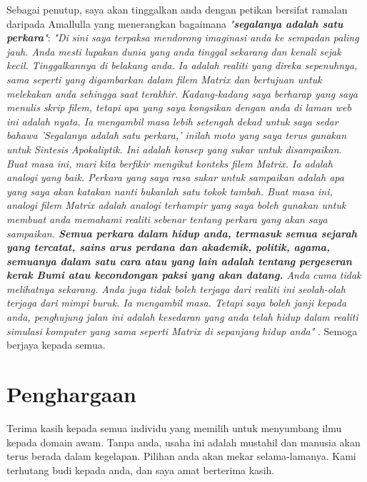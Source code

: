 \documentclass[10pt,twocolumn,letterpaper]{article}
\begin{document}
Sebagai penutup, saya akan tinggalkan anda dengan petikan bersifat ramalan daripada Amallulla yang menerangkan bagaimana \textit{"\textbf{segalanya adalah satu perkara}"}: \textit{"Di sini saya terpaksa mendorong imaginasi anda ke sempadan paling jauh. Anda mesti lupakan dunia yang anda tinggal sekarang dan kenali sejak kecil. Tinggalkannya di belakang anda. Ia adalah realiti yang direka sepenuhnya, sama seperti yang digambarkan dalam filem Matrix dan bertujuan untuk melekakan anda sehingga saat terakhir. Kadang-kadang saya berharap yang saya menulis skrip filem, tetapi apa yang saya kongsikan dengan anda di laman web ini adalah nyata. Ia mengambil masa lebih setengah dekad untuk saya sedar bahawa 'Segalanya adalah satu perkara,' inilah moto yang saya terus gunakan untuk Sintesis Apokaliptik. Ini adalah konsep yang sukar untuk disampaikan. Buat masa ini, mari kita berfikir mengikut konteks filem Matrix. Ia adalah analogi yang baik. Perkara yang saya rasa sukar untuk sampaikan adalah apa yang saya akan katakan nanti bukanlah satu tokok tambah. Buat masa ini, analogi filem Matrix adalah analogi terhampir yang saya boleh gunakan untuk membuat anda memahami realiti sebenar tentang perkara yang akan saya sampaikan. \textbf{Semua perkara dalam hidup anda, termasuk semua sejarah yang tercatat, sains arus perdana dan akademik, politik, agama, semuanya dalam satu cara atau yang lain adalah tentang pergeseran kerak Bumi atau kecondongan paksi yang akan datang.} Anda cuma tidak melihatnya sekarang. Anda juga tidak boleh terjaga dari realiti ini seolah-olah terjaga dari mimpi buruk. Ia mengambil masa. Tetapi saya boleh janji kepada anda, penghujung jalan ini adalah kesedaran yang anda telah hidup dalam realiti simulasi komputer yang sama seperti Matrix di sepanjang hidup anda"} \cite{33,34}.
Semoga berjaya kepada semua.

\section{Penghargaan}

Terima kasih kepada semua individu yang memilih untuk menyumbang ilmu kepada domain awam. Tanpa anda, usaha ini adalah mustahil dan manusia akan terus berada dalam kegelapan. Pilihan anda akan mekar selama-lamanya. Kami terhutang budi kepada anda, dan saya amat berterima kasih.
\clearpage
\twocolumn

{\small
\renewcommand{\refname}{Rujukan}


}
\end{document}
